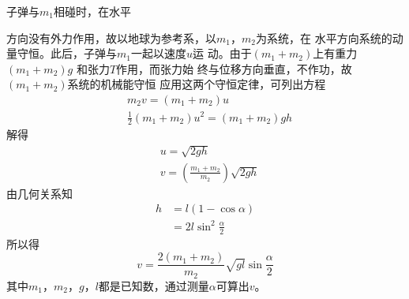 \resolve 子弹与$ m _ { 1 } $相碰时，在水平

方向没有外力作用，故以地球为参考系，以$ m _ 1 $，$ m _ 2 $为系统，在
水平方向系统的动量守恒。此后，子弹与$ m _ 1 $一起以速度$ u $运
动。由于$ \left( m _ { 1 } + m _ { 2 } \right) $上有重力$ \left( m _ { 1 } + m _ { 2 } \right) g $ 和张力$ T $作用，而张力始
终与位移方向垂直，不作功，故$ \left( m _ { 1 } + m _ { 2 } \right) $系统的机械能守恒
应用这两个守恒定律，可列出方程
\begin{equation*}
  \begin{split}
    &m _ { 2 } v = \left( m _ { 1 } + m _ { 2 } \right) u  \\
    &\frac { 1 } { 2 } \left( m _ { 1 } + m _ { 2 } \right) u ^ { 2 } = \left( m _ { 1 } + m _ { 2 } \right) g h
  \end{split}
\end{equation*}
解得\vspace{-1.56em}
\begin{equation*}
  \begin{split}
    &u = \sqrt { 2 g h }  \\
    &v = \left( \frac { m _ { 1 } + m _ { 2 } } { m _ { 2 } } \right) \sqrt { 2 g h }
  \end{split}
\end{equation*}
由几何关系知
\begin{equation*}
  \begin{split}
    h &= l \left( 1 - \cos \alpha \right) \\
    &= 2 l \sin ^ { 2 } \frac { \alpha } { 2 }
  \end{split}
\end{equation*}
所以得
\begin{equation*}
  v = \frac { 2 \left( m _ { 1 } + m _ { 2 } \right) } { m _ { 2 } } \sqrt { g l } \sin \frac { \alpha } { 2 }
\end{equation*}
其中$ m _ 1 $，$ m _ 2 $，$ g $，$ l $都是已知数，通过测量$ \alpha $可算出$ v $。